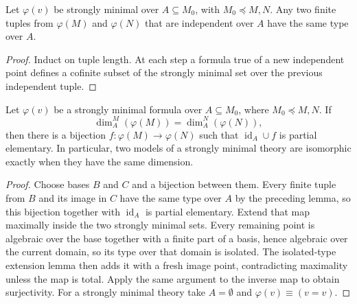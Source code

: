 \begin{lemma}
\label{lem:independent-tuples-same-type}
Let \(\varphi(v)\) be strongly minimal over \(A\subseteq M_0\), with
\(M_0\preceq M,N\).  Any two finite tuples from \(\varphi(M)\) and
\(\varphi(N)\) that are independent over \(A\) have the same type over
\(A\).
\end{lemma}

\begin{proof}
Induct on tuple length.  At each step a formula true of a new independent
point defines a cofinite subset of the strongly minimal set over the
previous independent tuple.
\end{proof}

\begin{theorem}
\label{thm:strongly-minimal-dimension-classification}
Let \(\varphi(v)\) be a strongly minimal formula over
\(A\subseteq M_0\), where \(M_0\preceq M,N\).  If
\[
  \dim_A^M(\varphi(M))=\dim_A^N(\varphi(N)),
\]
then there is a bijection \(f:\varphi(M)\to\varphi(N)\) such that
\(\operatorname{id}_A\cup f\) is partial elementary.  In particular,
two models of a strongly minimal theory are isomorphic exactly when
they have the same dimension.
\end{theorem}

\begin{proof}
Choose bases \(B\) and \(C\) and a bijection between them.  Every finite
tuple from \(B\) and its image in \(C\) have the same type over \(A\) by
the preceding lemma, so this bijection together with
\(\operatorname{id}_A\) is partial elementary.  Extend that map maximally
inside the two strongly minimal sets.  Every remaining point is
algebraic over the base together with a finite part of a basis, hence
algebraic over the current domain, so its type over that domain is
isolated.  The isolated-type extension lemma then adds it with a fresh
image point, contradicting maximality unless the map is total.  Apply
the same argument to the inverse map to obtain surjectivity.  For a
strongly minimal theory take \(A=\emptyset\) and
\(\varphi(v)\equiv(v=v)\).
\end{proof}

